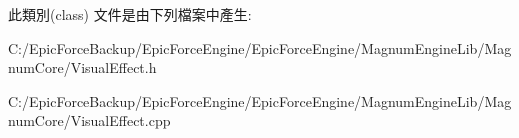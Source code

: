 此類別(class) 文件是由下列檔案中產生\+:\begin{DoxyCompactItemize}
\item 
C\+:/\+Epic\+Force\+Backup/\+Epic\+Force\+Engine/\+Epic\+Force\+Engine/\+Magnum\+Engine\+Lib/\+Magnum\+Core/Visual\+Effect.\+h\item 
C\+:/\+Epic\+Force\+Backup/\+Epic\+Force\+Engine/\+Epic\+Force\+Engine/\+Magnum\+Engine\+Lib/\+Magnum\+Core/Visual\+Effect.\+cpp\end{DoxyCompactItemize}
